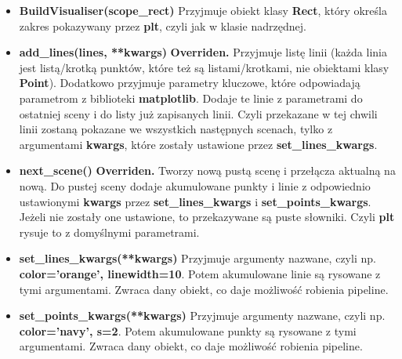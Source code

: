 \documentclass[a4paper, 12pt]{article}
\begin{document}
      \begin{itemize}
          \item \textbf{BuildVisualiser(scope\_rect)} \vspace{6pt}\newline
          \quad Przyjmuje obiekt klasy \textbf{Rect}, który określa zakres pokazywany przez \textbf{plt}, czyli jak w klasie nadrzędnej.
          \vspace{6pt}
          
          \item \textbf{add\_lines(lines, **kwargs)} \vspace{6pt}\newline
          \quad \textbf{Overriden.} Przyjmuje listę linii (każda linia jest listą/krotką punktów, które też są listami/krotkami, nie obiektami klasy \textbf{Point}). Dodatkowo przyjmuje parametry kluczowe, które odpowiadają parametrom z biblioteki \textbf{matplotlib}. Dodaje te linie z parametrami do ostatniej sceny i do listy już zapisanych linii. Czyli przekazane w tej chwili linii zostaną pokazane we wszystkich następnych scenach, tylko z argumentami \textbf{kwargs}, które zostały ustawione przez \textbf{set\_lines\_kwargs}.
          \vspace{6pt}
          
          \item \textbf{next\_scene()} \vspace{6pt}\newline
          \quad \textbf{Overriden.} Tworzy nową pustą scenę i przełącza aktualną na nową. Do pustej sceny dodaje akumulowane punkty i linie z odpowiednio ustawionymi \textbf{kwargs} przez \textbf{set\_lines\_kwargs} i \textbf{set\_points\_kwargs}. Jeżeli nie zostały one ustawione, to przekazywane są puste słowniki. Czyli \textbf{plt} rysuje to z domyślnymi parametrami.
          \vspace{6pt}
          
          \item \textbf{set\_lines\_kwargs(**kwargs)} \vspace{6pt}\newline
          \quad Przyjmuje argumenty nazwane, czyli np. \textbf{color='orange', linewidth=10}. Potem akumulowane linie są rysowane z tymi argumentami. Zwraca dany obiekt, co daje możliwość robienia pipeline.
          \vspace{6pt}
          
          \item \textbf{set\_points\_kwargs(**kwargs)} \vspace{6pt}\newline
          \quad Przyjmuje argumenty nazwane, czyli np. \textbf{color='navy', s=2}. Potem akumulowane punkty są rysowane z tymi argumentami. Zwraca dany obiekt, co daje możliwość robienia pipeline.
          \vspace{6pt}
          

\end{itemize}
\end{document}
